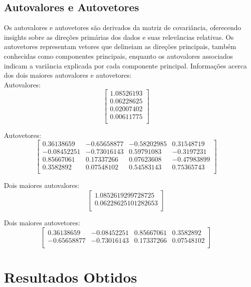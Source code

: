 \documentclass{article}
\begin{document}
\subsection*{Autovalores e Autovetores}

Os autovalores e autovetores são derivados da matriz de covariância, oferecendo insights sobre as direções primárias dos dados e suas relevâncias relativas. Os autovetores representam vetores que delineiam as direções principais, também conhecidas como componentes principais, enquanto os autovalores associados indicam a variância explicada por cada componente principal.
Informações acerca dos dois maiores autovalores e autovetores:\\

Autovalores:
\[
\begin{bmatrix}
1.08526193 \\ 
0.06228625 \\
0.02007402 \\
0.00611775 \\
\end{bmatrix}
\]

Autovetores:
\[
\begin{bmatrix}
0.36138659 & -0.65658877 & -0.58202985 &  0.31548719 \\
-0.08452251 & -0.73016143 & 0.59791083 & -0.3197231 \\
0.85667061 & 0.17337266 & 0.07623608 & -0.47983899 \\
0.3582892 & 0.07548102 & 0.54583143 & 0.75365743 \\
\end{bmatrix}
 \]
 
Dois maiores autovalores:
\[
\begin{bmatrix}
1.0852619299728725 \\
0.06228625101282653 \\
\end{bmatrix}
\]

Dois maiores autovetores:
\[
\begin{bmatrix}
0.36138659 & -0.08452251 & 0.85667061 & 0.3582892 \\
-0.65658877 & -0.73016143 & 0.17337266 & 0.07548102 \\
\end{bmatrix}
\]

\vspace*{1cm}

\section*{Resultados Obtidos}
\end{document}
